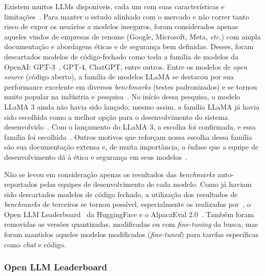 \documentclass[journal]{IEEEtran}
\begin{document}
\noindent%
Existem muitos LLMs disponíveis, cada um com suas características e limitações~\cite{radford2019language,zhao2023survey}.
Para manter o estudo alinhado com o mercado e não correr tanto risco de expor os usuários a modelos inseguros, foram considerados apenas aqueles vindos de empresas de renome (Google, Microsoft, Meta, \textit{etc.}) com ampla documentação e abordagens éticas e de segurança bem definidas.
Desses, foram descartados modelos de código-fechado como toda a família de modelos da OpenAI\@: GPT-3~\cite{floridi2020gpt}, GPT-4, ChatGPT, entre outros.
Entre os modelos de \textit{open source} (código aberto), a família de modelos LLaMA se destacou por sua performance excelente em diversos \textit{benchmarks} (testes padronizados) e se tornou muito popular na indústria e pesquisa~\cite{zhao2023survey,touvron2023llama,touvron2023llama2}.
No início dessa pesquisa, o modelo LLaMA 3 ainda não havia sido lançado; mesmo assim, a família LLaMA já havia sido escolhida como a melhor opção para o desenvolvimento do sistema desenvolvido~\cite{zhao2023survey,touvron2023llama,touvron2023llama2}.
Com o lançamento do LLaMA 3, a escolha foi confirmada, e essa família foi escolhida~\cite{meta2024llama3,llama3modelcard}.
Outros motivos que reforçam nossa escolha dessa família são sua documentação extensa e, de muita importância, a ênfase que a equipe de desenvolvimento dá à ética e segurança em seus modelos~\cite{meta2024llama3,llama3modelcard,inan2023llama}.

Não se levou em consideração apenas os resultados das \textit{benchmarks} auto-reportados pelas equipes de desenvolvimento de cada modelo.
Como já haviam sido descartados modelos de código fechado, a utilização dos resultados de \textit{benchmarks} de terceiros se tornou possível, especialmente os realizados por~\cite{zhao2023survey}, o Open LLM Leaderboard~\cite{open-llm-leaderboard} da HuggingFace e o AlpacaEval 2.0~\cite{alpaca_eval}.
Também foram removidas as versões quantizadas, modificadas ou com \textit{fine-tuning} da busca, mas foram mantidos aqueles modelos modificados (\textit{fine-tuned}) para tarefas específicas como \textit{chat} e código.

\subsubsection{Open LLM Leaderboard}
\end{document}
